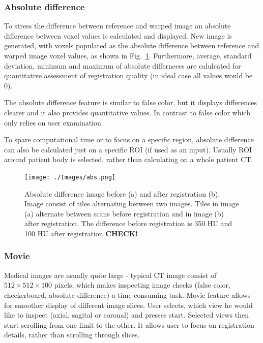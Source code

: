\documentclass[type=dr, dr=rernat, accentcolor=tud7b,colorbacktitle, bigchapter, openright, twoside, 12pt ]{tudthesis}
\begin{document}
\subsubsection{Absolute difference} 

To stress the difference between reference and warped image an absolute difference between voxel values is calculated and displayed. New image is generated, with voxels populated as the absolute difference between reference and warped image voxel values, as shown in Fig.~\ref{absDiff}. Furthermore, average, standard deviation, minimum and maximum of absolute differneces are calulcated for quantitative assessment of registration quality (in ideal case all values would be 0).

The absolute difference feature is similar to false color, but it displays differences clearer and it also provides quantitative values. In contrast to false color which only relies on user examination.

To spare computational time or to focus on a specific region, absolute difference can also be calculated just on a specific ROI (if used as an input). Usually ROI around patient body is selected, rather than calculating on a whole patient CT.

\begin{figure}[H]
	\begin{center}		
		\texttt{[image: ./Images/abs.png]}
		\caption{Absolute difference image before (a) and after registration (b).  Image consist of tiles alternating between two images. Tiles in image (a) alternate between scans before registration and in image (b) after registration. The difference before registration is 350 HU and 100 HU after registration \textbf{CHECK!}}
		\label{absDiff}
	\end{center}
\end{figure}

\subsubsection{Movie}

Medical images are usually quite large - typical CT image consist of $512 \times 512 \times 100$ pixels, which makes inspecting image checks (false color, checkerboard, absolute difference) a time-consuming task. Movie feature allows for smoother display of different image slices. User selects, which view he would like to inspect (axial, sagital or coronal) and presses start. Selected views then start scrolling from one limit to the other. It allows user to focus on registration details, rather than scrolling through slices.
\end{document}
